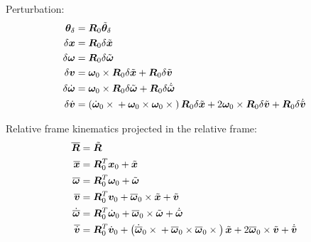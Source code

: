 \documentclass[10pt,fleqn,subeqn]{report}
\newcommand{\T}[1]{\bm{#1}}
\newcommand{\TT}[1]{\bm{#1}}
\begin{document}
Perturbation:
\begin{subequations}
\begin{align}
	\T{\theta}_{\delta} &= \TT{R}_0 \tilde{\T{\theta}}_{\delta} \\
	\delta\T{x} &= \TT{R}_0 \delta\tilde{\T{x}} \\
	\delta\T{\omega} &= \TT{R}_0 \delta\tilde{\T{\omega}} \\
	\delta\T{v} &= \T{\omega}_0 \times \TT{R}_0 \delta\tilde{\T{x}}
		+ \TT{R}_0 \delta\tilde{\T{v}} \\
	\delta\dot{\T{\omega}} &= \T{\omega}_0 \times \TT{R}_0 \delta\tilde{\T{\omega}} 
		+ \TT{R}_0 \delta\dot{\tilde{\T{\omega}}} \\
	\delta\dot{\T{v}} &= \plbr{
			\dot{\T{\omega}}_0 \times{}
			+ \T{\omega}_0 \times \T{\omega}_0 \times{}
		} \TT{R}_0 \delta\tilde{\T{x}}
		+ 2 \T{\omega}_0 \times \TT{R}_0 \delta\tilde{\T{v}}
		+ \TT{R}_0 \delta\dot{\tilde{\T{v}}}
\end{align}
\end{subequations}

Relative frame kinematics projected in the relative frame:
\begin{subequations}
\begin{align}
	\overline{\TT{R}} &= \tilde{\TT{R}} \\
	\overline{\T{x}} &= \TT{R}_0^T \T{x}_0
		+ \tilde{\T{x}} \\
	\overline{\T{\omega}} &= \TT{R}_0^T \T{\omega}_0
		+ \tilde{\T{\omega}} \\
	\overline{\T{v}} &= \TT{R}_0^T \T{v}_0
		+ \overline{\T{\omega}}_0 \times \tilde{\T{x}}
		+ \tilde{\T{v}} \\
	\dot{\overline{\T{\omega}}} &= \TT{R}_0^T \dot{\T{\omega}}_0
		+ \overline{\T{\omega}}_0 \times \tilde{\T{\omega}} 
		+ \dot{\tilde{\T{\omega}}} \\
	\overline{\dot{\T{v}}} &= \TT{R}_0^T \dot{\T{v}}_0
		+ \plbr{
			\dot{\overline{\T{\omega}}}_0 \times{}
			+ \overline{\T{\omega}}_0 \times \overline{\T{\omega}}_0 \times{}
		} \tilde{\T{x}}
		+ 2 \overline{\T{\omega}}_0 \times \tilde{\T{v}}
		+ \dot{\tilde{\T{v}}}
\end{align}
\end{subequations}
\end{document}
